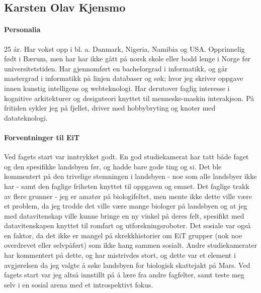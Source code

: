 \subsection{Karsten Olav Kjensmo}

\paragraph{Personalia}
25 år. Har vokst opp i bl. a. Danmark, Nigeria, Namibia og USA. Opprinnelig født i Bærum, men har har ikke gått på norsk skole eller bodd lenge i Norge før universitetstiden. Har gjennomført en bachelorgrad i informatikk, og går mastergrad i informatikk på linjen databaser og søk; hvor jeg skriver oppgave innen kunstig intelligens og webteknologi. Har derutover faglig interesse i kognitive arkitekturer og designteori knyttet til menneske-maskin interakjson. På fritiden sykler jeg på fjellet, driver med hobbybryting og knoter med datateknologi. 

\paragraph{Forventninger til EiT}
Ved fagets start var inntrykket godt. En god studiekamerat har tatt både faget og den spesifikke landsbyen før, og hadde bare gode ting og si. Det ble kommentert på den trivelige stemningen i landsbyen - noe som alle landsbyer ikke har - samt den faglige friheten knyttet til oppgaven og emnet. Det faglige trakk av flere grunner - jeg er amatør på biologifeltet, men mente ikke dette ville være et problem, da jeg trodde det ville være mange biologer på landsbyen og at jeg med datavitenskap ville kunne bringe en ny vinkel på deres felt, spesifikt med datavitenskapen knyttet til romfart og utforskningsroboter. Det sosiale var også en faktor, da det ikke er mangel på skrekkhistorier om EiT grupper (nok noe overdrevet eller selvpåført) som ikke hang sammen sosialt. Andre studiekamerater har kommentert på dette, og har mistrivdes stort, og dette var et element i avgjørelsen da jeg valgte å søke landsbyen for biologisk skattejakt på Mars. Ved fagets start var jeg altså innstillt på å lære fra andre fagfelter, samt teste meg selv i en sosial arena med et introspektivt fokus. 




